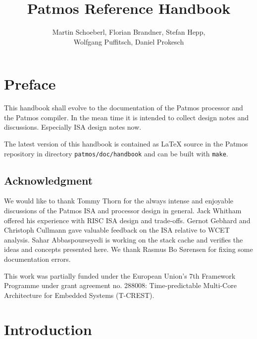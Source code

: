 \documentclass[a4paper,fontsize=10pt,twoside,DIV15,BCOR12mm,headinclude=true,footinclude=false,pagesize,bibtotoc]{scrbook}
\newcommand{\code}[1]{{\texttt{#1}}}
\newcommand{\todo}[1]{{\emph{TODO: #1}}}
\begin{document}
\title{Patmos Reference Handbook}

\author{Martin Schoeberl, Florian Brandner, Stefan Hepp,\\Wolfgang Puffitsch, Daniel Prokesch}

\lowertitleback{\todo{Copyright and license terms come here.}}

\frontmatter

\maketitle

\chapter{Preface}

This handbook shall evolve to the documentation of the Patmos processor and the
Patmos compiler. In the mean time it is intended to collect design notes and discussions.
Especially ISA design notes now.

The latest version of this handbook is contained as LaTeX source in the Patmos repository in directory
\code{patmos/doc/handbook} and can be built with \code{make}.

\section*{Acknowledgment}

We would like to thank Tommy Thorn for the always intense and enjoyable
discussions of the Patmos ISA and processor design in general.
Jack Whitham offered his experience with RISC
ISA design and trade-offs.
Gernot Gebhard and Christoph Cullmann gave valuable feedback on the ISA
relative to WCET analysis.
Sahar Abbaspourseyedi is working on the stack
cache and verifies the ideas and concepts presented here. We thank
Rasmus Bo S{\o}rensen for fixing some documentation errors.

This work was partially funded under the
European Union's 7th Framework Programme
under grant agreement no. 288008:
Time-predictable Multi-Core Architecture for Embedded
Systems (T-CREST).

\tableofcontents

\begingroup
\let\cleardoublepage\clearpage
\listoffigures
\listoftables
\endgroup

\mainmatter

\chapter{Introduction}
\end{document}
